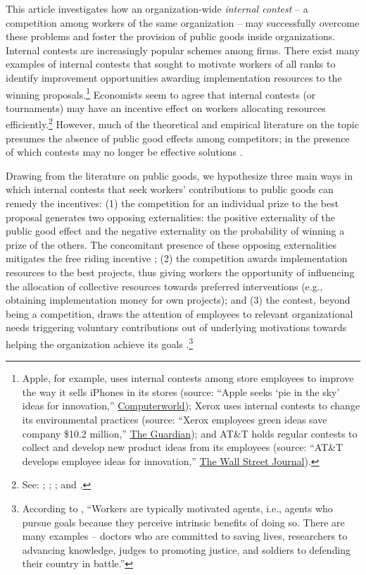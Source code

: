 \documentclass[12pt, titlepage]{article}
\begin{document}
This article investigates how an organization-wide \emph{internal
contest} -- a competition among workers of the same organization -- may
successfully overcome these problems and foster the provision of public
goods inside organizations. Internal contests are increasingly popular
schemes among firms. There exist many examples of internal contests that
sought to motivate workers of all ranks to identify improvement
opportunities awarding implementation resources to the winning
proposals.\footnote{Apple, for example, uses internal contests among
  store employees to improve the way it sells iPhones in its stores
  (source: ``Apple seeks `pie in the sky' ideas for innovation,''
  \href{http://www.computerworld.com/article/2474058/smartphones/apple-seeks--pie-in-the-sky--ideas-for-innovation}{Computerworld});
  Xerox uses internal contests to change its environmental practices
  (source: ``Xerox employees green ideas save company \$10.2 million,''
  \href{http://www.theguardian.com/sustainable-business/xerox-employees-green-ideas-save}{The
  Guardian}); and AT\&T holds regular contests to collect and develop
  new product ideas from its employees (source: ``AT\&T develops
  employee ideas for innovation,''
  \href{http://blogs.wsj.com/cio/2014/11/12/att-develops-employee-ideas-for-innovation}{The
  Wall Street Journal}).} Economists seem to agree that internal
contests (or tournaments) may have an incentive effect on workers
allocating resources efficiently.\footnote{See: \citet{lazear1981rank};
  \citet{green1983comparison}; \citet{nalebuff1983prizes}; and
  \citet{mary1984economic}.} However, much of the theoretical and
empirical literature on the topic presumes the absence of public good
effects among competitors; in the presence of which contests may no
longer be effective solutions \citep{drago1988incentive}.

Drawing from the literature on public goods, we hypothesize three main
ways in which internal contests that seek workers' contributions to
public goods can remedy the incentives: (1) the competition for an
individual prize to the best proposal generates two opposing
externalities: the positive externality of the public good effect and
the negative externality on the probability of winning a prize of the
others. The concomitant presence of these opposing externalities
mitigates the free riding incentive \citep{morgan2000financing}; (2) the
competition awards implementation resources to the best projects, thus
giving workers the opportunity of influencing the allocation of
collective resources towards preferred interventions (e.g., obtaining
implementation money for own projects); and (3) the contest, beyond
being a competition, draws the attention of employees to relevant
organizational needs triggering voluntary contributions out of
underlying motivations towards helping the organization achieve its
goals \citep{besley2005competition, rotemberg2006altruism}.\footnote{According
  to \citet{besley2005competition}, ``Workers are typically motivated
  agents, i.e., agents who pursue goals because they perceive intrinsic
  benefits of doing so. There are many examples -- doctors who are
  committed to saving lives, researchers to advancing knowledge, judges
  to promoting justice, and soldiers to defending their country in
  battle.''}
\end{document}

